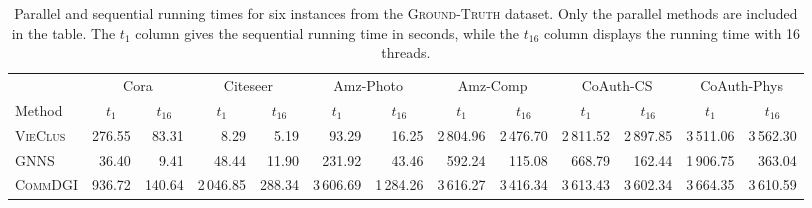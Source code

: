 \documentclass[../paper.tex]{subfiles}
\begin{document}

\begin{table}[H]
    \caption{Parallel and sequential running times for six instances from the \textsc{Ground-Truth} dataset. Only the parallel methods are included in the table. The $t_1$ column gives the sequential running time in seconds, while the $t_{16}$ column displays the running time with 16 threads. }
    \label{tab:par-seq}
    \small
    \begin{tabular}{l|rr|rr|rr|rr|rr|rr}
        \toprule
                           & \multicolumn{2}{c|}{Cora} & \multicolumn{2}{c|}{Citeseer} & \multicolumn{2}{c|}{Amz-Photo} & \multicolumn{2}{c|}{Amz-Comp} & \multicolumn{2}{c|}{CoAuth-CS} & \multicolumn{2}{c}{CoAuth-Phys}                                                                                                                                                                                    \\ \cline{2-13}
        Method             & \multicolumn{1}{c}{$t_1$} & \multicolumn{1}{c|}{$t_{16}$} & \multicolumn{1}{c}{$t_1$}      & \multicolumn{1}{c|}{$t_{16}$} & \multicolumn{1}{c}{$t_1$}      & \multicolumn{1}{c|}{$t_{16}$}   & \multicolumn{1}{c}{$t_1$} & \multicolumn{1}{c|}{$t_{16}$} & \multicolumn{1}{c}{$t_1$} & \multicolumn{1}{c|}{$t_{16}$} & \multicolumn{1}{c}{$t_1$} & \multicolumn{1}{c}{$t_{16}$} \\
        \midrule
        \textsc{VieClus}   & 276.55                    & 83.31                         & 8.29                           & 5.19                          & 93.29                          & 16.25                           & 2\,804.96                 & 2\,476.70                     & 2\,811.52                 & 2\,897.85                     & 3\,511.06                 & 3\,562.30                    \\
        \textsc{GNNS}      & 36.40                     & 9.41                          & 48.44                          & 11.90                         & 231.92                         & 43.46                           & 592.24                    & 115.08                        & 668.79                    & 162.44                        & 1\,906.75                 & 363.04                       \\
        \textsc{CommDGI}   & 936.72                    & 140.64                        & 2\,046.85                      & 288.34                        & 3\,606.69                      & 1\,284.26                       & 3\,616.27                 & 3\,416.34                     & 3\,613.43                 & 3\,602.34                     & 3\,664.35                 & 3\,610.59                    \\

\end{tabular}
\end{table}
\end{document}
